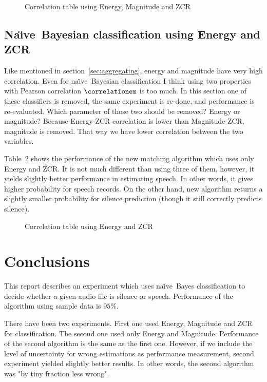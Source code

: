 \documentclass[english,11pt]{article}
\newcommand{\naive}{na\"{\i}ve\ }
\newcommand{\Naive}{Na\"{\i}ve\ }
\numberwithin{equation}{section}
\begin{document}
\begin{figure}
    \centering
    \caption{Correlation table using Energy, Magnitude and ZCR}
    \correlationtableemz
    \label{tab:correlation_table_emz}
\end{figure}

\subsection{\Naive Bayesian classification using Energy and ZCR}

Like mentioned in section~\ref{sec:aggregating}, energy and magnitude have very
high correlation. Even for \naive Bayesian classification I think using two
properties with Pearson correlation $\correlationem$ is too much. In this
section one of these classifiers is removed, the same experiment is re-done,
and performance is re-evaluated. Which parameter of those two should be
removed? Energy or magnitude? Because Energy-ZCR correlation is lower than
Magnitude-ZCR, magnitude is removed. That way we have lower correlation between
the two variables.

Table~\ref{tab:correlation_table_ez} shows the performance of the new matching
algorithm which uses only Energy and ZCR. It is not much different than using
three of them, however, it yields slightly better performance in estimating
speech. In other words, it gives higher probability for speech records. On the
other hand, new algorithm returns a slightly smaller probability for silence
prediction (though it still correctly predicts silence).

\begin{figure}
    \centering
    \caption{Correlation table using Energy and ZCR}
    \correlationtableez
    \label{tab:correlation_table_ez}
\end{figure}

\section{Conclusions}

This report describes an experiment which uses \naive Bayes classification
to decide whether a given audio file is silence or speech. Performance of the
algorithm using sample data is $95\%$.

There have been two experiments. First one used Energy, Magnitude and ZCR for
classification. The second one used only Energy and Magnitude. Performance of
the second algorithm is the same as the first one. However, if we include the
level of uncertainty for wrong estimations as performance measurement, second
experiment yielded slightly better results. In other words, the second algorithm
was "by tiny fraction less wrong".
\end{document}
